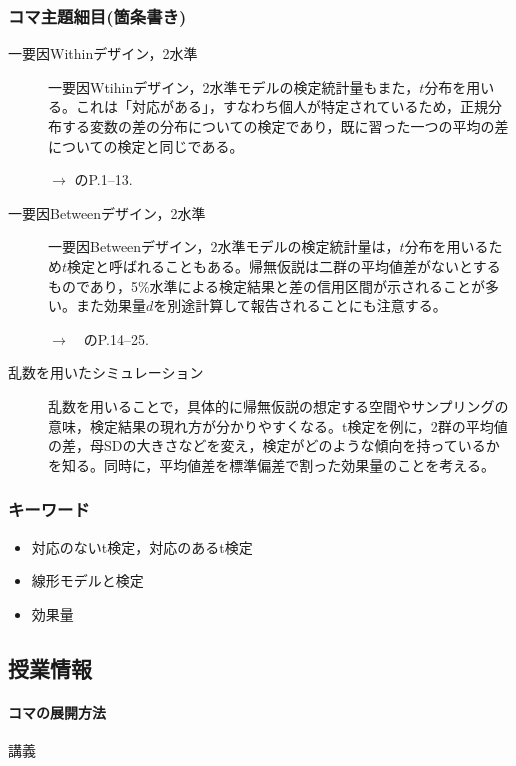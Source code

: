 \subsubsection{コマ主題細目(箇条書き)}
\begin{description}


    \item[一要因Withinデザイン，2水準]一要因Wtihinデザイン，2水準モデルの検定統計量もまた，$t$分布を用いる。これは「対応がある」，すなわち個人が特定されているため，正規分布する変数の差の分布についての検定であり，既に習った一つの平均の差についての検定と同じである。
\begin{flushright}
    $\to$ \citet{橋本201607}のP.1--13.
\end{flushright}

\item[一要因Betweenデザイン，2水準]一要因Betweenデザイン，2水準モデルの検定統計量は，$t$分布を用いるため$t$検定と呼ばれることもある。帰無仮説は二群の平均値差がないとするものであり，5\%水準による検定結果と差の信用区間が示されることが多い。また効果量$d$を別途計算して報告されることにも注意する。
\begin{flushright}
    $\to$　\citet{橋本201607}のP.14--25.
\end{flushright}

\item[乱数を用いたシミュレーション]乱数を用いることで，具体的に帰無仮説の想定する空間やサンプリングの意味，検定結果の現れ方が分かりやすくなる。t検定を例に，2群の平均値の差，母SDの大きさなどを変え，検定がどのような傾向を持っているかを知る。同時に，平均値差を標準偏差で割った効果量のことを考える。
 

\end{description}
\subsubsection{キーワード}
\begin{itemize}
\item 対応のないt検定，対応のあるt検定
\item 線形モデルと検定
\item 効果量
\end{itemize}
\subsection{授業情報}
\paragraph{コマの展開方法}
講義
